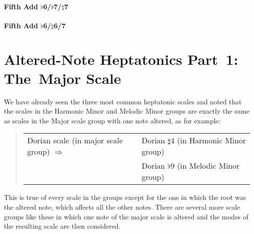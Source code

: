 \documentclass[english]{./gbook}
\newcommand{\titlebreak}{}
\begin{document}
\begin{large}
\subsubsection{Fifth Add $\flat$6/$\flat$7/$\natural$7}
\subsubsection{Fifth Add $\flat$6/$\natural$6/7}





\chapter{\mbox{Altered}-\mbox{Note} \mbox{Heptatonics} \titlebreak \mbox{Part 1:} \mbox{The Major} \mbox{Scale}}

We have already seen the three most common heptatonic scales and noted that the scales in the Harmonic Minor and Melodic Minor groups are exactly the same as scales in the Major scale group with one note altered, as for example:
\begin{quote}
\begin{tabular}{ll}
Dorian scale (in major scale group) $\Rightarrow$ &Dorian $\sharp 4$ (in Harmonic Minor group) \\
					&Dorian $\flat 9$ (in Melodic Minor group)
\end{tabular}
\end{quote}
This is true of every scale in the groups except for the one in which the root was the altered note, which affects all the other notes. There are several more scale groups like these in which one note of the major scale is altered and the modes of the resulting scale are then considered.


\end{large}
\end{document}
